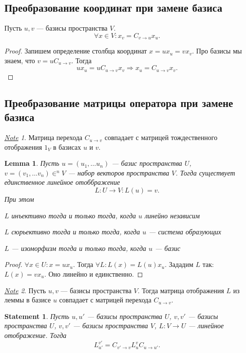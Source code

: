 \documentclass[11pt]{book}
\theoremstyle{definition}
\theoremstyle{plain}
\theoremstyle{plain}
\newtheorem{lm}{Lemma}
\newtheorem{st}{Statement}
\theoremstyle{definition}
\theoremstyle{remark}
\newtheorem*{note}{\underline{Note}}
\begin{document}
\subsection{Преобразование координат при замене базиса}
\begin{thm}
    Пусть $ u, v$ --- базисы пространства  $ V$.
    \[
	\forall x \in V: x_v = C_{v \to  u}x_u
    .\]
\end{thm}
\begin{proof}
    Запишем определение столбца координат $ x = ux_u  = vx_v$.
    Про базисы мы знаем, что  $ v = u C_{u \to  v}$. Тогда
    \[
	ux_u = u C_{u \to  v} x_v \Longrightarrow x_u = C_{u \to  v} x_v
    .\]
\end{proof}
\subsection{Преобразование матрицы оператора при замене базиса}
\begin{note}
    Матрица перехода $ C_{u \to  v}$ совпадает с матрицей тождественного отображения $ 1_{V}$ в базисах $ u$ и  $ v$.
\end{note}
\begin{lm}
    Пусть $ u  = (u_1, \ldots u_n)$ --- базис пространства $ U$,  $ v = (v_1, \ldots v_n) \in ^n\!\!V$ --- набор векторов пространства $ V$. Тогда существует единственное линейное отоббражение
    \[
	L: U \to V: L(u) = v
    .\]
    При этом
    \begin{description}[noitemsep]
	\item $ L$ инъективно  тогда и только тогда, когда $ u$ линейно независим
	\item $ L$ сюрьективно  тогда и только тогда, когда $ u$ --- система образующих
	\item $ L$ --- изоморфизм  тогда и только тогда, когда  $ u $ --- базис
    \end{description}
\end{lm}
\begin{proof}
    $ \forall x \in U: x = ux_u$. Тогда $ \forall L: L(x) = L(u)x_u$. Зададим $ L$ так:  $ L(x) = v x_u$. Оно линейно и единственно.
\end{proof}
\begin{note}
    Пусть $ u, v$ --- базисы пространства  $ V$. Тогда  матрица отображения  $ L$ из леммы в базисе $ u$ совпадает с  матрицей перехода  $ C_{u \to  v}$.
\end{note}
\begin{st}
    Пусть $ u, u'$ --- базисы пространства  $ U$,  $ v, v'$ --- базисы пространства  $ U$,  $ v, v'$ --- базисы пространства  $ V$,  $ L: V \to  U$ --- линейное отображение. Тогда
    \[
	L_{u'}^{v'} = C_{v' \to  v}L_{u}^{v}C_{u \to  u'}
    .\]
\end{st}
\end{document}
